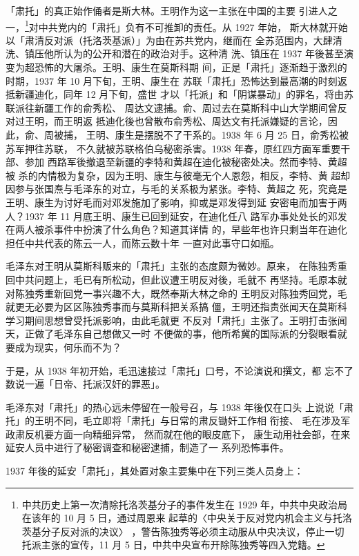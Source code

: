 「肃托」的真正始作俑者是斯大林。王明作为这一主张在中国的主要
引进人之一，\footnote{中共历史上第一次清除托洛茨基分子的事件发生在 1929 年，中共中央政治局在该年的 10 月 5 日，通过周恩来
起草的〈中央关于反对党内机会主义与托洛茨基分子反对派的决议〉
，警告陈独秀等必须主动服从中央决议，停止一切
托派主张的宣传，11 月 5 日，中共中央宣布开除陈独秀等四入党籍。}对中共党内的「肃托」负有不可推卸的责任。从 1927 年始，
斯大林就开始以「肃清反对派（托洛茨基派）」为由在苏共党内，继而在
全苏范围内，大肆清洗、镇压他所认为的公开和潜在的政治对手。这种清
洗、镇压在 1937 年後甚至演变为超恐怖的大屠杀。王明、康生在莫斯科期
间，正是「肃托」逐渐趋于激烈的时期，1937 年 10 月下旬，王明、康生在
苏联「肃托」恐怖达到最高潮的时刻返抵新疆迪化，同年 12 月下旬，盛世
才以「托派」和「阴谋暴动」的罪名，将由苏联派往新疆工作的俞秀松、
周达文逮捕。俞、周过去在莫斯科中山大学期间曾反对过王明，而王明返
抵迪化後也曾散布俞秀松、周达文有托派嫌疑的言论，因此，俞、周被捕，
王明、康生是摆脱不了干系的。1938 年 6 月 25 日，俞秀松被苏军押往苏联，
不久就被苏联格伯乌秘密杀害。1938 年春，原红四方面军重要干部、参加
西路军後撤退至新疆的李特和黄超在迪化被秘密处决。然而李特、黄超被
杀的内情极为复杂，因为王明、康生与彼毫无个人恩怨，相反，李特、黄
超却因参与张国焘与毛泽东的对立，与毛的关系极为紧张。李特、黄超之
死，究竟是王明、康生为讨好毛而对邓发施加了影响，抑或是邓发得到延
安密电而加害于两人？1937 年 11 月底王明、康生已回到延安，在迪化任八
路军办事处处长的邓发在两人被杀事件中扮演了什么角色？知道其详情
的，早些年也许只剩当年在迪化担任中共代表的陈云一人，而陈云数十年
一直对此事守口如瓶。

毛泽东对王明从莫斯科贩来的「肃托」主张的态度颇为微妙。原来，
在陈独秀重回中共问题上，毛已有所松动，但此议遭王明反对後，毛就不
再坚持。毛原本就对陈独秀重新回党一事兴趣不大，既然奉斯大林之命的
王明反对陈独秀回党，毛就更无必要为区区陈独秀事而与莫斯科把关系搞
僵，王明还指责张闻天在莫斯科学习期间思想曾受托派影响，由此毛就更
不反对「肃托」主张了。王明打击张闻天，正做了毛泽东自己想做又一时
不便做的事，他所希冀的国际派的分裂眼看就要成为现实，何乐而不为？

于是，从 1938 年初开始，毛迅速接过「肃托」口号，不论演说和撰文，都
忘不了数说一遍「日帝、托派汉奸的罪恶」。

毛泽东对「肃托」的热心远未停留在一般号召，与 1938 年後仅在口头
上说说「肃托」的王明不同，毛立即将「肃托」与日常的肃反锄奸工作相
衔接、
毛在涉及军政肃反机要方面一向精细异常，
然而就在他的眼皮底下，
康生动用社会部，在来延安人员中进行了秘密调查和秘密逮捕，制造了一
系列恐怖事件。

1937 年後的延安「肃托」，其处置对象主要集中在下列三类人员身上：

